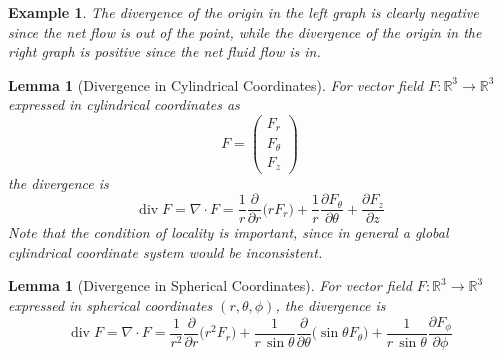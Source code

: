 \documentclass{article}
\DeclareMathOperator{\Div}{div}
\newtheorem{lemma}[theorem]{Lemma}
\newtheorem{example}{Example}[section]
\theoremstyle{remark}
\theoremstyle{definition}
\begin{document}
\begin{example}
The divergence of the origin in the left graph is clearly negative since the net flow is out of the point, while the divergence of the origin in the right graph is positive since the net fluid flow is in. 
\begin{center}
\pgfplotsset{width=7cm,compat=1.16}
\end{center}
\end{example}

\begin{lemma}[Divergence in Cylindrical Coordinates]
For vector field $F: \mathbb{R}^3 \longrightarrow \mathbb{R}^3$ expressed in cylindrical coordinates as 
\[F = \begin{pmatrix}
F_r \\ F_\theta \\ F_z
\end{pmatrix}\]
the divergence is
\[\Div F = \nabla \cdot F = \frac{1}{r} \frac{\partial}{\partial r} \big(r F_r \big) + \frac{1}{r} \frac{\partial F_\theta}{\partial \theta} + \frac{\partial F_z}{\partial z}\]
Note that the condition of locality is important, since in general a global cylindrical coordinate system would be inconsistent. 
\end{lemma}

\begin{lemma}[Divergence in Spherical Coordinates]
For vector field $F: \mathbb{R}^3 \longrightarrow \mathbb{R}^3$ expressed in spherical coordinates $(r, \theta, \phi)$, the divergence is 
\[\Div F = \nabla \cdot F = \frac{1}{r^2} \frac{\partial}{\partial r} \big( r^2 F_r) + \frac{1}{r \, \sin{\theta}} \frac{\partial}{\partial \theta} \big( \sin{\theta} F_\theta\big) + \frac{1}{r\, \sin{\theta}} \frac{\partial F_\phi}{\partial \phi}\]
\end{lemma}
\end{document}
